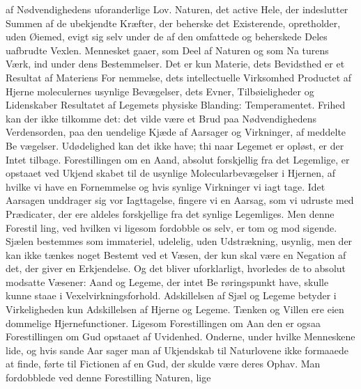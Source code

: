 \documentclass[12pt,a4paper]{book}
\begin{document}
af Nødvendighedens uforanderlige Lov. Naturen, det active
Hele, der indeslutter Summen af de ubekjendte Kræfter, der
beherske det Existerende, opretholder, uden Øiemed, evigt sig
selv under de af den omfattede og beherskede Deles uafbrudte
Vexlen. Mennesket gaaer, som Deel af Naturen og som Na\-%
turens Værk, ind under dens Bestemmelser. Det er kun
Materie, dets Bevidsthed er et Resultat af Materiens For\-%
nemmelse, dets intellectuelle Virksomhed Productet af Hjerne\-%
moleculernes usynlige Bevægelser, dets Evner, Tilbøieligheder
og Lidenskaber Resultatet af Legemets physiske Blanding:
Temperamentet. Frihed kan der ikke tilkomme det: det vilde
være et Brud paa Nødvendighedens Verdensorden, paa den
uendelige Kjæde af Aarsager og Virkninger, af meddelte Be\-%
vægelser. Udødelighed kan det ikke have; thi naar Legemet
er opløst, er der Intet tilbage. Forestillingen om en Aand,
absolut forskjellig fra det Legemlige, er opstaaet ved Ukjend\-%
skabet til de usynlige Molecularbevægelser i Hjernen, af hvilke
vi have en Fornemmelse og hvis synlige Virkninger vi iagt\-%
tage. Idet Aarsagen unddrager sig vor Iagttagelse, fingere vi
en Aarsag, som vi udruste med Prædicater, der ere aldeles
forskjellige fra det synlige Legemliges. Men denne Forestil\-%
ling, ved hvilken vi ligesom fordobble os selv, er tom og mod\-%
sigende. Sjælen bestemmes som immateriel, udelelig, uden
Udstrækning, usynlig, men der kan ikke tænkes noget Bestemt
ved et Væsen, der kun skal være en Negation af det, der
giver en Erkjendelse. Og det bliver uforklarligt, hvorledes de
to absolut modsatte Væsener: Aand og Legeme, der intet Be\-%
røringspunkt have, skulle kunne staae i Vexelvirkningsforhold.
Adskillelsen af Sjæl og Legeme betyder i Virkeligheden kun
Adskillelsen af Hjerne og Legeme. Tænken og Villen ere eien\-%
dommelige Hjernefunctioner. Ligesom Forestillingen om Aan\-%
den er ogsaa Forestillingen om Gud opstaaet af Uvidenhed.
Onderne, under hvilke Menneskene lide, og hvis sande Aar\-%
sager man af Ukjendskab til Naturlovene ikke formaaede at
finde, førte til Fictionen af en Gud, der skulde være deres
Ophav. Man fordobblede ved denne Forestilling Naturen, lige\-%
\end{document}
